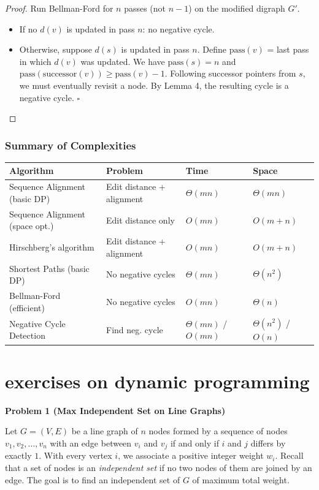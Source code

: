 \documentclass[12pt,a4paper]{report}
\begin{document}
\begin{proof}
Run Bellman-Ford for $n$ passes (not $n-1$) on the modified digraph $G'$.
\begin{itemize}
    \item If no $d(v)$ is updated in pass $n$: no negative cycle.
    \item Otherwise, suppose $d(s)$ is updated in pass $n$. Define
    $\text{pass}(v)$ = last pass in which $d(v)$ was updated. We have
    $\text{pass}(s) = n$ and $\text{pass}(\text{successor}(v)) \geq \text{pass}(v) - 1$.
    Following successor pointers from $s$, we must eventually revisit a node. By Lemma 4,
    the resulting cycle is a negative cycle. \qquad$\square$
\end{itemize}
\end{proof}

\subsection{Summary of Complexities}

\begin{center}
\begin{tabular}{@{}llll@{}}
\toprule
\textbf{Algorithm} & \textbf{Problem} & \textbf{Time} & \textbf{Space} \\
\midrule
Sequence Alignment (basic DP) & Edit distance + alignment & $\Theta(mn)$ & $\Theta(mn)$ \\
Sequence Alignment (space opt.) & Edit distance only & $O(mn)$ & $O(m+n)$ \\
Hirschberg's algorithm & Edit distance + alignment & $O(mn)$ & $O(m+n)$ \\
Shortest Paths (basic DP) & No negative cycles & $\Theta(mn)$ & $\Theta(n^2)$ \\
Bellman-Ford (efficient) & No negative cycles & $O(mn)$ & $\Theta(n)$ \\
Negative Cycle Detection & Find neg. cycle & $\Theta(mn)$ / $O(mn)$ & $\Theta(n^2)$ / $O(n)$ \\
\bottomrule
\end{tabular}
\end{center}

\chapter{ exercises on dynamic programming}
\textbf{Problem 1 (Max Independent Set on Line Graphs)}

Let $G = (V,E)$ be a line graph of $n$ nodes formed by a sequence of nodes
$v_1, v_2, \ldots, v_n$ with an edge between $v_i$ and $v_j$ if and only if
$i$ and $j$ differs by exactly $1$. With every vertex $i$, we associate a
positive integer weight $w_i$. Recall that a set of nodes is an
\emph{independent set} if no two nodes of them are joined by an edge.
The goal is to find an independent set of $G$ of maximum total weight.
\end{document}
